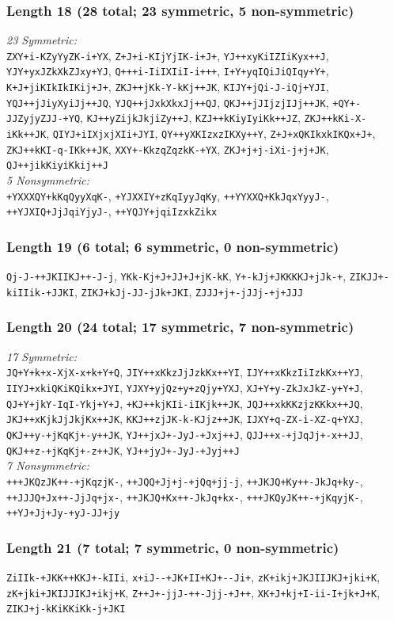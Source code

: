 \documentclass[12pt]{article}
\numberwithin{equation}{section}
\begin{document}
\subsubsection*{Length 18 (28 total; 23 symmetric, 5 non-symmetric)}
\raggedright
\emph{23 Symmetric:}\\
\verb|ZXY+i-KZyYyZK-i+YX|, \verb|Z+J+i-KIjYjIK-i+J+|, \verb|YJ++xyKiIZIiKyx++J|, \verb|YJY+yxJZkXkZJxy+YJ|, \verb|Q+++i-IiIXIiI-i+++|, \verb|I+Y+yqIQiJiQIqy+Y+|, \verb|K+J+jiKIkIkIKij+J+|, \verb|ZKJ++jKk-Y-kKj++JK|, \verb|KIJY+jQi-J-iQj+YJI|, \verb|YQJ++jJiyXyiJj++JQ|, \verb|YJQ++jJxkXkxJj++QJ|, \verb|QKJ++jJIjzjIJj++JK|, \verb|+QY+-JJZyjyZJJ-+YQ|, \verb|KJ++yZijkJkjiZy++J|, \verb|KZJ++kKiyIyiKk++JZ|, \verb|ZKJ++kKi-X-iKk++JK|, \verb|QIYJ+iIXjxjXIi+JYI|, \verb|QY++yXKIzxzIKXy++Y|, \verb|Z+J+xQKIkxkIKQx+J+|, \verb|ZKJ++kKI-q-IKk++JK|, \verb|XXY+-KkzqZqzkK-+YX|, \verb|ZKJ+j+j-iXi-j+j+JK|, \verb|QJ++jikKiyiKkij++J|
\\[0.5\baselineskip]
\emph{5 Nonsymmetric:}\\
\verb|+YXXXQY+kKqQyyXqK-|, \verb|+YJXXIY+zKqIyyJqKy|, \verb|++YYXXQ+KkJqxYyyJ-|, \verb|++YJXIQ+JjJqiYjyJ-|, \verb|++YQJY+jqiIzxkZikx|\\
\subsubsection*{Length 19 (6 total; 6 symmetric, 0 non-symmetric)}
\raggedright
\verb|Qj-J-++JKIIKJ++-J-j|, \verb|YKk-Kj+J+JJ+J+jK-kK|, \verb|Y+-kJj+JKKKKJ+jJk-+|, \verb|ZIKJJ+-kiIIik-+JJKI|, \verb|ZIKJ+kJj-JJ-jJk+JKI|, \verb|ZJJJ+j+-jJJj-+j+JJJ|
\subsubsection*{Length 20 (24 total; 17 symmetric, 7 non-symmetric)}
\raggedright
\emph{17 Symmetric:}\\
\verb|JQ+Y+k+x-XjX-x+k+Y+Q|, \verb|JIY++xKkzJjJzkKx++YI|, \verb|IJY++xKkzIiIzkKx++YJ|, \verb|IIYJ+xkiQKiKQikx+JYI|, \verb|YJXY+yjQz+y+zQjy+YXJ|, \verb|XJ+Y+y-ZkJxJkZ-y+Y+J|, \verb|QJ+Y+jkY-IqI-Ykj+Y+J|, \verb|+KJ++kjKIi-iIKjk++JK|, \verb|JQJ++xkKKzjzKKkx++JQ|, \verb|JKJ++xKjkJjJkjKx++JK|, \verb|KKJ++zjJK-k-KJjz++JK|, \verb|IJXY+q-ZX-i-XZ-q+YXJ|, \verb|QKJ++y-+jKqKj+-y++JK|, \verb|YJ++jxJ+-JyJ-+Jxj++J|, \verb|QJJ++x-+jJqJj+-x++JJ|, \verb|QKJ++z-+jKqKj+-z++JK|, \verb|YJ++jyJ+-JyJ-+Jyj++J|
\\[0.5\baselineskip]
\emph{7 Nonsymmetric:}\\
\verb|+++JKQzJK++-+jKqzjK-|, \verb|++JQQ+Jj+j-+jQq+jj-j|, \verb|++JKJQ+Ky++-JkJq+ky-|, \verb|++JJJQ+Jx++-JjJq+jx-|, \verb|++JKJQ+Kx++-JkJq+kx-|, \verb|+++JKQyJK++-+jKqyjK-|, \verb|++YJ+Jj+Jy-+yJ-JJ+jy|\\
\subsubsection*{Length 21 (7 total; 7 symmetric, 0 non-symmetric)}
\raggedright
\verb|ZiIIk-+JKK++KKJ+-kIIi|, \verb|x+iJ--+JK+II+KJ+--Ji+|, \verb|zK+ikj+JKJIIJKJ+jki+K|, \verb|zK+jki+JKIJJIKJ+ikj+K|, \verb|Z++J+-jjJ-++-Jjj-+J++|, \verb|XK+J+kj+I-ii-I+jk+J+K|, \verb|ZIKJ+j-kKiKKiKk-j+JKI|
\end{document}
